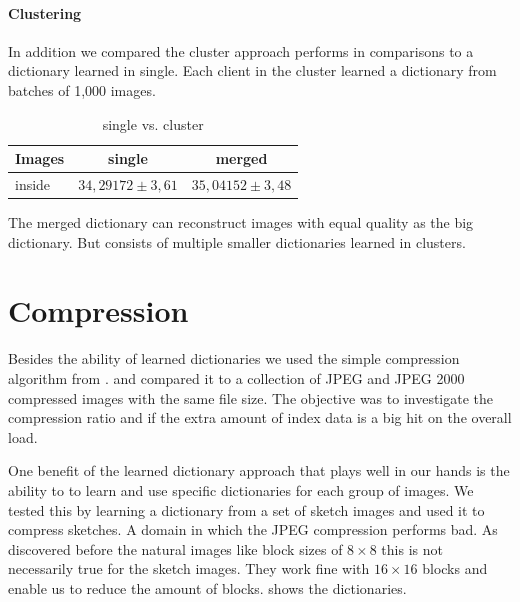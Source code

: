 \paragraph{Clustering}
In addition we compared the cluster approach performs in
comparisons to a dictionary learned in single. Each client in the cluster
learned a dictionary from batches of 1,000 images.

\begin{table}[h]
\centering
\begin{tabular}{| l | c | c |}
\hline\hline
Images & single & merged \\
\hline
inside & $34,29172 \pm 3,61$ & $35,04152 \pm 3,48$  \\
\hline
\end{tabular}
\caption{single vs. cluster}
\end{table}
The merged dictionary can reconstruct images with equal quality as the big
dictionary. But consists of multiple smaller dictionaries learned in clusters.


\newpage
\section{Compression}
Besides the ability of learned dictionaries 
we used the simple compression algorithm from .
and compared it to a collection of JPEG and JPEG 2000 compressed images with the
same file size. The objective was to investigate the compression ratio and if
the extra amount of index data is a big hit on the overall load.

One benefit of the learned dictionary approach that plays well in our
hands is the ability to to learn and use specific dictionaries for each group of
images. We tested this by learning a dictionary from a set of sketch images and
used it to compress sketches. A domain in which the JPEG compression performs
bad. As discovered before the natural images like block sizes of $8\times 8$
this is not necessarily true for the sketch images. They work fine with
$16\times 16$ blocks and enable us to reduce the amount of blocks.
 shows the dictionaries. 


